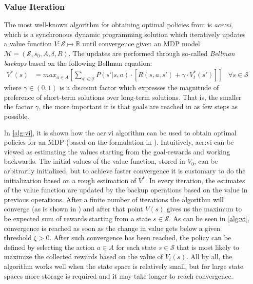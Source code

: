 \subsubsection*{Value Iteration}
\label{sec:value-iteration}

The most well-known algorithm for obtaining optimal policies from  is \textit{\acrfull{acr:vi}}, which is a synchronous dynamic programming solution which iteratively updates a value function $V: \mathcal{S} \mapsto \mathbb{R}$ until convergence given an MDP model $\mathcal{M} = (\mathcal{S}, s_0, A, \delta, R)$.
The updates are performed through so-called \textit{Bellman backups} based on the following Bellman equation:
\begin{align}
	V^*(s) &= max_{a \in A} \left[\sum_{s' \in \mathcal{S}} P(s' \vert s, a) \cdot \left[R(s, a, s') + \gamma \cdot V^*_{t}(s')\right]\right]	&\forall s \in \mathcal{S}
\end{align}
where $\gamma \in (0,1)$ is a discount factor which expresses the magnitude of preference of short-term solutions over long-term solutions. That is, the smaller the factor $\gamma$, the more important it is that goals are reached in as few steps as possible.

In \autoref{alg:vi}, it is shown how the \acrshort{acr:vi} algorithm can be used to obtain optimal policies for an MDP (based on the formulation in \cite{poole2010artificial}).
Intuitively, \acrshort{acr:vi} can be viewed as estimating the values starting from the goal-rewards and working backwards.
The initial values of the value function, stored in $V_0$, can be arbitrarily initialized, but to achieve faster convergence it is customary to do the initialization based on a rough estimation of $V^*$.
In every iteration, the estimates of the value function are updated by the backup operations based on the value in previous operations.
After a finite number of iterations the algorithm will converge (as is shown in \cite{puterman2014markov}) and after that point $V(s)$ gives us the maximum to be expected sum of rewards starting from a state $s \in \mathcal{S}$.
As can be seen in \autoref{alg:vi}, convergence is reached as soon as the change in value gets below a given threshold $\xi > 0$.
After such convergence has been reached, the policy can be defined by selecting the action $a \in A$ for each state $s \in \mathcal{S}$ that is most likely to maximize the collected rewards based on the value of $V_t(s)$.
All by all, the algorithm works well when the state space is relatively small, but for large state spaces more storage is required and it may take longer to reach convergence.

